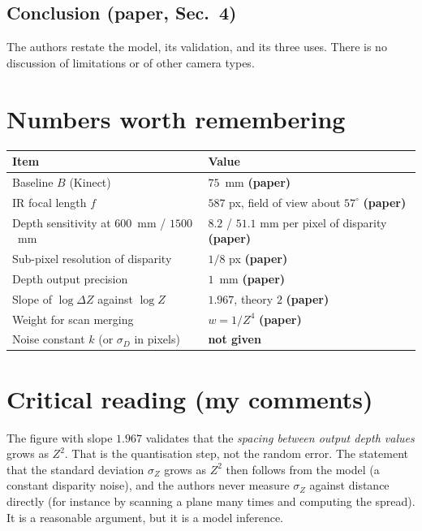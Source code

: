 \documentclass[11pt,a4paper]{article}
\begin{document}
\subsection{Conclusion (paper, Sec.~4)}
The authors restate the model, its validation, and its three uses. There is no discussion of
limitations or of other camera types.

\section{Numbers worth remembering}

\begin{center}
\small
\begin{tabularx}{\textwidth}{@{}X l@{}}
\toprule
Item & Value \\
\midrule
Baseline $B$ (Kinect) & $75$~mm \textbf{(paper)} \\
IR focal length $f$ & $587$ px, field of view about $57^\circ$ \textbf{(paper)} \\
Depth sensitivity at $600$~mm / $1500$~mm & $8.2$ / $51.1$ mm per pixel of disparity \textbf{(paper)} \\
Sub-pixel resolution of disparity & $1/8$ px \textbf{(paper)} \\
Depth output precision & $1$~mm \textbf{(paper)} \\
Slope of $\log\Delta Z$ against $\log Z$ & $1.967$, theory $2$ \textbf{(paper)} \\
Weight for scan merging & $w=1/Z^4$ \textbf{(paper)} \\
Noise constant $k$ (or $\sigma_D$ in pixels) & \textbf{not given} \\
\bottomrule
\end{tabularx}
\end{center}

\section{Critical reading (my comments)}

\begin{warn}
The figure with slope $1.967$ validates that the \emph{spacing between output depth values} grows
as $Z^2$. That is the quantisation step, not the random error. The statement that the standard
deviation $\sigma_Z$ grows as $Z^2$ then follows from the model (a constant disparity noise),
and the authors never measure $\sigma_Z$ against distance directly (for instance by scanning a
plane many times and computing the spread). It is a reasonable argument, but it is a model
inference.
\end{warn}
\end{document}
